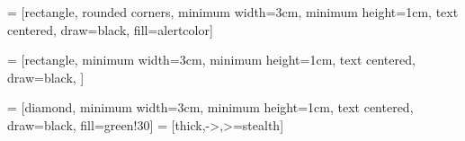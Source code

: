 \pgfplotsset{compat=newest}
    \usetikzlibrary{plotmarks}
    \usetikzlibrary{calc}
    \usetikzlibrary{positioning}
    \usetikzlibrary{arrows.meta}
    \usetikzlibrary{matrix}
    \usetikzlibrary{shapes.geometric, arrows}
    
     = [rectangle, rounded corners, 
    minimum width=3cm, 
    minimum height=1cm,
    text centered, 
    draw=black, 
    fill=alertcolor]
    
     = [rectangle, 
    minimum width=3cm, 
    minimum height=1cm, 
    text centered, 
    draw=black, 
    ]
    
     = [diamond, 
    minimum width=3cm, 
    minimum height=1cm, 
    text centered, 
    draw=black, 
    fill=green!30]
     = [thick,->,>=stealth]